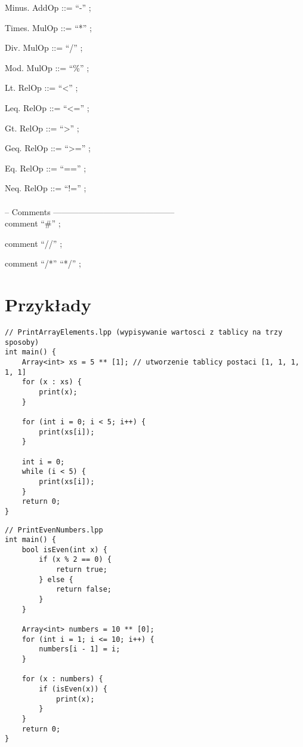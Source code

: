 \documentclass[a4paper]{article}
\begin{document}
Minus. AddOp ::= ``-'' ;

Times. MulOp ::= ``*'' ;

Div. MulOp ::= ``/'' ;

Mod. MulOp ::= ``\%'' ;

Lt. RelOp ::= ``<'' ;

Leq. RelOp ::= ``<='' ;

Gt. RelOp ::= ``>'' ;

Geq. RelOp ::= ``>='' ;

Eq. RelOp ::= ``=='' ;

Neq. RelOp ::= ``!='' ;
\\\\
\noindent
-- Comments --------------------------------------------\\

comment ``\#'' ;

comment ``//'' ;

comment ``/*'' ``*/'' ;

\section*{Przykłady}
\begin{lstlisting}
// PrintArrayElements.lpp (wypisywanie wartosci z tablicy na trzy sposoby)
int main() {
    Array<int> xs = 5 ** [1]; // utworzenie tablicy postaci [1, 1, 1, 1, 1]
    for (x : xs) {
        print(x);
    }

    for (int i = 0; i < 5; i++) {
        print(xs[i]);
    }

    int i = 0;
    while (i < 5) {
        print(xs[i]);
    }
    return 0;
}
\end{lstlisting}

\begin{lstlisting}
// PrintEvenNumbers.lpp
int main() {
    bool isEven(int x) {
        if (x % 2 == 0) {
            return true;
        } else {
            return false;
        } 
    }

    Array<int> numbers = 10 ** [0];
    for (int i = 1; i <= 10; i++) {
        numbers[i - 1] = i;
    }

    for (x : numbers) {
        if (isEven(x)) {
            print(x);
        }
    }
    return 0;
}
\end{lstlisting}
\end{document}

